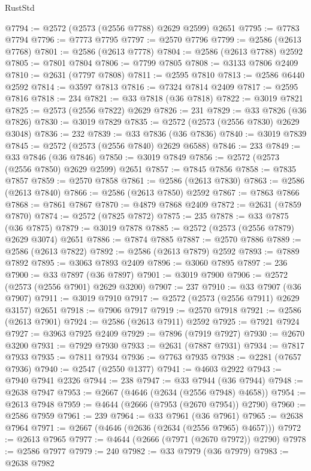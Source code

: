 \begin{lexlean}{RustStd}
\begin{coremodule}
@7794 := @2572 (@2573 (@2556 @7788) @2629 @2599) @2651
@7795 := @7783 @7794
@7796 := @7773 @7795
@7797 := @2570 @7796
@7799 := @2586 (@2613 @7768)
@7801 := @2586 (@2613 @7778)
@7804 := @2586 (@2613 @7788) @2592
@7805 := @7801 @7804
@7806 := @7799 @7805
@7808 := @3133 @7806 @2409
@7810 := @2631 (@7797 @7808)
@7811 := @2595 @7810
@7813 := @2586 @6440 @2592
@7814 := @3597 @7813
@7816 := @7324 @7814 @2409
@7817 := @2595 @7816
@7818 := 234
@7821 := @33 @7818 (@36 @7818)
@7822 := @3019 @7821
@7825 := @2573 (@2556 @7822) @2629
@7826 := 231
@7829 := @33 @7826 (@36 @7826)
@7830 := @3019 @7829
@7835 := @2572 (@2573 (@2556 @7830) @2629 @3048)
@7836 := 232
@7839 := @33 @7836 (@36 @7836)
@7840 := @3019 @7839
@7845 := @2572 (@2573 (@2556 @7840) @2629 @6588)
@7846 := 233
@7849 := @33 @7846 (@36 @7846)
@7850 := @3019 @7849
@7856 := @2572 (@2573 (@2556 @7850) @2629 @2599) @2651
@7857 := @7845 @7856
@7858 := @7835 @7857
@7859 := @2570 @7858
@7861 := @2586 (@2613 @7830)
@7863 := @2586 (@2613 @7840)
@7866 := @2586 (@2613 @7850) @2592
@7867 := @7863 @7866
@7868 := @7861 @7867
@7870 := @4879 @7868 @2409
@7872 := @2631 (@7859 @7870)
@7874 := @2572 (@7825 @7872)
@7875 := 235
@7878 := @33 @7875 (@36 @7875)
@7879 := @3019 @7878
@7885 := @2572 (@2573 (@2556 @7879) @2629 @3074) @2651
@7886 := @7874 @7885
@7887 := @2570 @7886
@7889 := @2586 (@2613 @7822)
@7892 := @2586 (@2613 @7879) @2592
@7893 := @7889 @7892
@7895 := @3063 @7893 @2409
@7896 := @3060 @7895
@7897 := 236
@7900 := @33 @7897 (@36 @7897)
@7901 := @3019 @7900
@7906 := @2572 (@2573 (@2556 @7901) @2629 @3200)
@7907 := 237
@7910 := @33 @7907 (@36 @7907)
@7911 := @3019 @7910
@7917 := @2572 (@2573 (@2556 @7911) @2629 @3157) @2651
@7918 := @7906 @7917
@7919 := @2570 @7918
@7921 := @2586 (@2613 @7901)
@7924 := @2586 (@2613 @7911) @2592
@7925 := @7921 @7924
@7927 := @3963 @7925 @2409
@7929 := @7896 (@7919 @7927)
@7930 := @2670 @3200
@7931 := @7929 @7930
@7933 := @2631 (@7887 @7931)
@7934 := @7817 @7933
@7935 := @7811 @7934
@7936 := @7763 @7935
@7938 := @2281 (@7657 @7936)
@7940 := @2547 (@2550 @1377)
@7941 := @4603 @2922
@7943 := @7940 @7941 @2326
@7944 := 238
@7947 := @33 @7944 (@36 @7944)
@7948 := @2638 @7947
@7953 := @2667 (@4646 (@2634 (@2556 @7948) @4658))
@7954 := @2613 @7948
@7959 := @4644 (@2666 (@7953 (@2670 @7954)) @2790)
@7960 := @2586 @7959
@7961 := 239
@7964 := @33 @7961 (@36 @7961)
@7965 := @2638 @7964
@7971 := @2667 (@4646 (@2636 (@2634 (@2556 @7965) @4657)))
@7972 := @2613 @7965
@7977 := @4644 (@2666 (@7971 (@2670 @7972)) @2790)
@7978 := @2586 @7977
@7979 := 240
@7982 := @33 @7979 (@36 @7979)
@7983 := @2638 @7982

\end{coremodule}
\end{lexlean}
